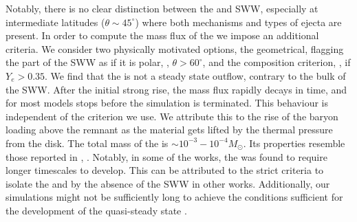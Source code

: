 Notably, there is no clear distinction between the \nwind{} and \ac{SWW}, especially 
at intermediate latitudes ($\theta \sim 45^{\circ}$) where both mechanisms and 
types of ejecta are present.
%
In order to compute the mass flux of the \nwind{} we impose an additional criteria.
We consider two physically motivated options, the geometrical, flagging the part of 
the \ac{SWW} as \nwind{} if it is polar, \ie, $\theta>60^{\circ}$, and the 
composition criterion, \ie, if $Y_e > 0.35$.
%
We find that the \nwind{} is not a steady state outflow, contrary to the 
bulk of the \ac{SWW}. After the initial strong rise, the mass flux rapidly 
decays in time, and for most models stops before the simulation is terminated. 
This behaviour is independent of the criterion we use. We attribute this to the 
rise of the baryon loading above the remnant as the material gets lifted 
by the thermal pressure from the disk.
The total mass of the \nwind{} is ${\sim}10^{-3}-10^{-4}M_{\odot}$. Its 
properties resemble those reported in \eg, 
\citet{Dessart:2008zd,Perego:2014fma,Fujibayashi:2020dvr}.
Notably, in some of the works, the \nwind{} was found to require longer 
timescales to develop. %
This can be attributed to the strict criteria to isolate the \nwind{} and by 
the absence of the \ac{SWW} in other works. 
Additionally, our simulations might not be sufficiently long to achieve the 
conditions sufficient for the development of the quasi-steady state \nwind{}.













